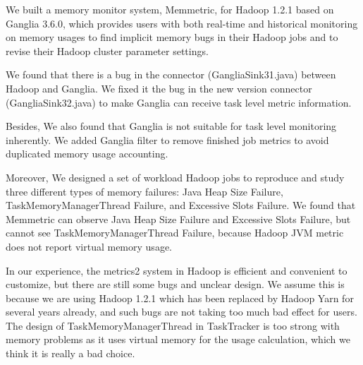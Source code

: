 We built a memory monitor system, Memmetric, for Hadoop 1.2.1 based on Ganglia 3.6.0, which provides users with both real-time and historical monitoring on memory usages to find implicit memory bugs in their Hadoop jobs and to revise their Hadoop cluster parameter settings. 

We found that there is a bug in the connector (GangliaSink31.java) between Hadoop and Ganglia. We fixed it the bug in the new version connector (GangliaSink32.java) to make Ganglia can receive task level metric information.

Besides, We also found that Ganglia is not suitable for task level monitoring inherently. We added Ganglia filter to remove finished job metrics to avoid duplicated memory usage accounting.

Moreover, We designed a set of workload Hadoop jobs to reproduce and study three different types of memory failures: Java Heap Size Failure, TaskMemoryManagerThread Failure, and Excessive Slots Failure. We found that Memmetric can observe Java Heap Size Failure and Excessive Slots Failure, but cannot see TaskMemoryManagerThread Failure, because Hadoop JVM metric does not report virtual memory usage.

In our experience, the metrics2 system in Hadoop is efficient and convenient to customize, but there are still some bugs and unclear design. We assume this is because we are using Hadoop 1.2.1 which has been replaced by Hadoop Yarn for several years already, and such bugs are not taking too much bad effect for users. The design of TaskMemoryManagerThread in TaskTracker is too strong with memory problems as it uses virtual memory for the usage calculation, which we think it is really a bad choice.